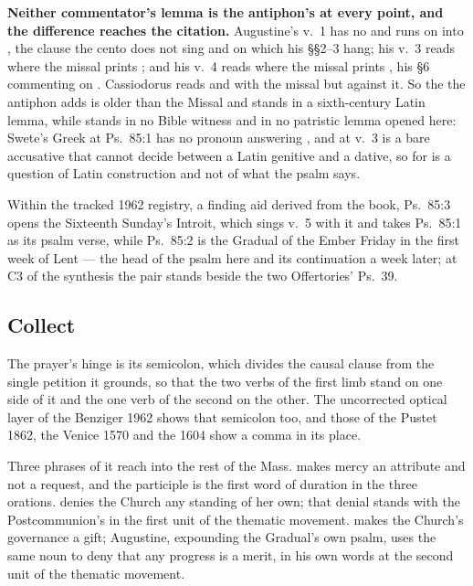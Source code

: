 \textbf{Neither commentator's lemma is the antiphon's at every point, and the
difference reaches the citation.} Augustine's v.~1 has no  and runs
on into , the clause the cento does not
sing and on which his §§2--3 hang; his v.~3 reads  where the
missal prints ; and his v.~4 reads  where the missal
prints , his §6 commenting on . Cassiodorus reads
 and  with the missal but 
against it. So the  the antiphon adds is older than the Missal and
stands in a sixth-century Latin lemma, while  stands in no
Bible witness and in no patristic lemma opened here: Swete's Greek at Ps.~85:1
has no pronoun answering
, and  at v.~3 is a bare accusative that cannot
decide between a Latin genitive and a dative, so  for  is a
question of Latin construction and not of what the psalm says.

Within the tracked 1962 registry, a finding aid derived from the book, Ps.~85:3
opens the Sixteenth Sunday's Introit, which sings v.~5 with it
and takes Ps.~85:1 as its psalm verse, while Ps.~85:2  is the Gradual of the Ember Friday in the first week of Lent --- the head of the psalm here and its
continuation a week later; at C3 of the synthesis the pair stands beside the two
Offertories' Ps.~39.

\subsection*{Collect }

 The prayer's
hinge is its semicolon, which divides the causal clause from the single petition
it grounds, so that the two verbs of the first limb stand on one side of it and
the one verb of the second on the other. The uncorrected optical layer of the
Benziger 1962 shows that semicolon too, and those of the Pustet 1862, the Venice
1570 and the 1604  show a comma in its place.

Three phrases of it reach into the rest of the Mass.  makes mercy an attribute and not a request, and the participle is the
first word of duration in the three orations.  denies the Church any standing of her own; that denial stands with
the Postcommunion's in the first unit of the thematic movement.  makes the
Church's governance a gift; Augustine, expounding the Gradual's own psalm, uses
the same noun to deny that any progress is a merit, in his own words at the
second unit of the thematic movement.

